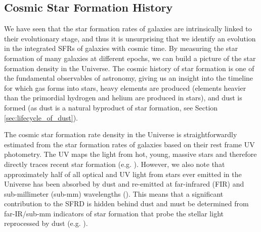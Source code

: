 \subsection{Cosmic Star Formation History}
\label{sec:cosmic_star_formation_history}

We have seen that the star formation rates of galaxies are intrinsically linked to their evolutionary stage, and thus it is unsurprising that we identify an evolution in the integrated SFRs of galaxies with cosmic time. By measuring the star formation of many galaxies at different epochs, we can build a picture of the star formation density in the Universe. The cosmic history of star formation is one of the fundamental observables of astronomy, giving us an insight into the timeline for which gas forms into stars, heavy elements are produced (elements heavier than the primordial hydrogen and helium are produced in stars), and dust is formed (as dust is a natural byproduct of star formation, see Section \ref{sec:lifecycle_of_dust}).

The cosmic star formation rate density in the Universe is straightforwardly estimated from the star formation rates of galaxies based on their rest frame UV photometry. The UV maps the light from hot, young, massive stars and therefore directly traces recent star formation (e.g. \citealt{Madau_1996, Lilly_1996, Wyder_2005, Schiminovich_2005, Dahlen_2007, Reddy_2009, Robotham_2011, Cucciati_2012, Schenker_2013, Finkelstein_2015}). However, we also note that approximately half of all optical and UV light from stars ever emitted in the Universe has been absorbed by dust and re-emitted at far-infrared (FIR) and sub-millimeter (sub-mm) wavelengths (\citealt{Puget_1996, Fixsen_1998, Dole_2006, Driver_2008, Driver_2016}). This means that a significant contribution to the SFRD is hidden behind dust and must be determined from far-IR/sub-mm indicators of star formation that probe the stellar light reprocessed by dust (e.g. \citealt{Magnelli_2011, Casey_2012, Magnelli_2013, Gruppioni_2013, Swinbank_2014, Bouwens_2016, Bourne_2017, Koprowski_2017, Novak_2017, Liu_2018, Bouwens_2020, Dudzeviciute_2020}).

